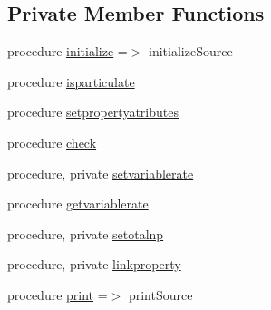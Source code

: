 \subsection*{Private Member Functions}
\begin{DoxyCompactItemize}
\item 
procedure \mbox{\hyperlink{structsources__mod_1_1source__class_a996650639d039c09d2b77a36473e977e}{initialize}} =$>$ initialize\+Source
\item 
procedure \mbox{\hyperlink{structsources__mod_1_1source__class_aa0577157bf75a525f9e1bde905500ab7}{isparticulate}}
\item 
procedure \mbox{\hyperlink{structsources__mod_1_1source__class_a1cdbd1115f420bf0bda21067940bcb58}{setpropertyatributes}}
\item 
procedure \mbox{\hyperlink{structsources__mod_1_1source__class_acbed40c917e4dacc0cd9dd7931e27839}{check}}
\item 
procedure, private \mbox{\hyperlink{structsources__mod_1_1source__class_aa7fb066bddba81b55086c885232104d5}{setvariablerate}}
\item 
procedure \mbox{\hyperlink{structsources__mod_1_1source__class_a446e7c4d39947e53b9a59c8e41a8c6d3}{getvariablerate}}
\item 
procedure, private \mbox{\hyperlink{structsources__mod_1_1source__class_a6098dbb749bed525919e6370aed70ef9}{setotalnp}}
\item 
procedure, private \mbox{\hyperlink{structsources__mod_1_1source__class_a58282637980cd13f683be32cb57dc227}{linkproperty}}
\item 
procedure \mbox{\hyperlink{structsources__mod_1_1source__class_af632299e6c5e29a7f2008417aa68d529}{print}} =$>$ print\+Source
\end{DoxyCompactItemize}
